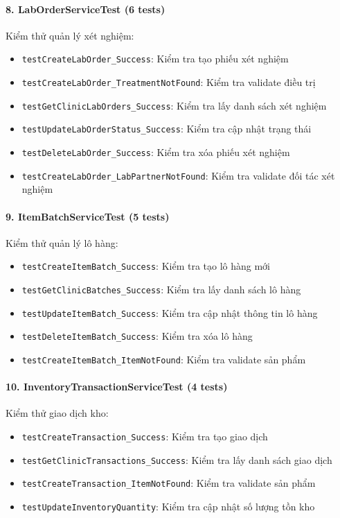 \paragraph{8. LabOrderServiceTest (6 tests)}
Kiểm thử quản lý xét nghiệm:
\begin{itemize}
    \item \texttt{testCreateLabOrder\_Success}: Kiểm tra tạo phiếu xét nghiệm
    \item \texttt{testCreateLabOrder\_TreatmentNotFound}: Kiểm tra validate điều trị
    \item \texttt{testGetClinicLabOrders\_Success}: Kiểm tra lấy danh sách xét nghiệm
    \item \texttt{testUpdateLabOrderStatus\_Success}: Kiểm tra cập nhật trạng thái
    \item \texttt{testDeleteLabOrder\_Success}: Kiểm tra xóa phiếu xét nghiệm
    \item \texttt{testCreateLabOrder\_LabPartnerNotFound}: Kiểm tra validate đối tác xét nghiệm
\end{itemize}

\paragraph{9. ItemBatchServiceTest (5 tests)}
Kiểm thử quản lý lô hàng:
\begin{itemize}
    \item \texttt{testCreateItemBatch\_Success}: Kiểm tra tạo lô hàng mới
    \item \texttt{testGetClinicBatches\_Success}: Kiểm tra lấy danh sách lô hàng
    \item \texttt{testUpdateItemBatch\_Success}: Kiểm tra cập nhật thông tin lô hàng
    \item \texttt{testDeleteItemBatch\_Success}: Kiểm tra xóa lô hàng
    \item \texttt{testCreateItemBatch\_ItemNotFound}: Kiểm tra validate sản phẩm
\end{itemize}

\paragraph{10. InventoryTransactionServiceTest (4 tests)}
Kiểm thử giao dịch kho:
\begin{itemize}
    \item \texttt{testCreateTransaction\_Success}: Kiểm tra tạo giao dịch
    \item \texttt{testGetClinicTransactions\_Success}: Kiểm tra lấy danh sách giao dịch
    \item \texttt{testCreateTransaction\_ItemNotFound}: Kiểm tra validate sản phẩm
    \item \texttt{testUpdateInventoryQuantity}: Kiểm tra cập nhật số lượng tồn kho
\end{itemize}

